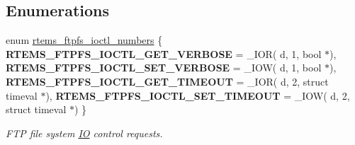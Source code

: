 \subsection*{Enumerations}
\begin{DoxyCompactItemize}
\item 
\mbox{\label{group__rtems__ftpfs_gaa5a739b575dafe5b2e925d291d0ed474}} 
enum \mbox{\hyperlink{group__rtems__ftpfs_gaa5a739b575dafe5b2e925d291d0ed474}{rtems\+\_\+ftpfs\+\_\+ioctl\+\_\+numbers}} \{ {\bfseries R\+T\+E\+M\+S\+\_\+\+F\+T\+P\+F\+S\+\_\+\+I\+O\+C\+T\+L\+\_\+\+G\+E\+T\+\_\+\+V\+E\+R\+B\+O\+SE} = \+\_\+\+I\+OR( \textquotesingle{}d\textquotesingle{}, 1, bool $\ast$), 
{\bfseries R\+T\+E\+M\+S\+\_\+\+F\+T\+P\+F\+S\+\_\+\+I\+O\+C\+T\+L\+\_\+\+S\+E\+T\+\_\+\+V\+E\+R\+B\+O\+SE} = \+\_\+\+I\+OW( \textquotesingle{}d\textquotesingle{}, 1, bool $\ast$), 
{\bfseries R\+T\+E\+M\+S\+\_\+\+F\+T\+P\+F\+S\+\_\+\+I\+O\+C\+T\+L\+\_\+\+G\+E\+T\+\_\+\+T\+I\+M\+E\+O\+UT} = \+\_\+\+I\+OR( \textquotesingle{}d\textquotesingle{}, 2, struct timeval $\ast$), 
{\bfseries R\+T\+E\+M\+S\+\_\+\+F\+T\+P\+F\+S\+\_\+\+I\+O\+C\+T\+L\+\_\+\+S\+E\+T\+\_\+\+T\+I\+M\+E\+O\+UT} = \+\_\+\+I\+OW( \textquotesingle{}d\textquotesingle{}, 2, struct timeval $\ast$)
 \}
\begin{DoxyCompactList}\small\item\em F\+TP file system \mbox{\hyperlink{structIO}{IO}} control requests. \end{DoxyCompactList}\end{DoxyCompactItemize}
